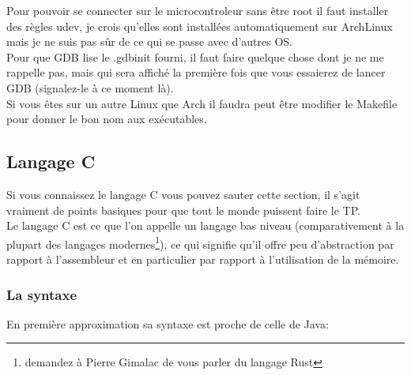 \documentclass[a4paper,10pt]{article} %
\begin{document}
Pour pouvoir se connecter sur le microcontroleur sans être root il faut installer des règles udev, je crois qu'elles sont installées automatiquement sur ArchLinux mais je ne suis pas sûr de ce qui se passe avec d'autres OS.\\

Pour que GDB lise le .gdbinit fourni, il faut faire quelque chose dont je ne me rappelle pas, mais qui sera affiché la première fois que vous essaierez de lancer GDB (signalez-le à ce moment là).\\

Si vous êtes sur un autre Linux que Arch il faudra peut être modifier le Makefile pour donner le bon nom aux exécutables.

\subsection{\label{rappels_c}Langage C}
Si vous connaissez le langage C vous pouvez sauter cette section, il s'agit vraiment de points basiques pour que tout le monde puissent faire le TP.\\

Le langage C est ce que l'on appelle un langage bas niveau (comparativement à la plupart des langages modernes\footnote{demandez à Pierre Gimalac de vous parler du langage Rust}), ce qui signifie qu'il offre peu d'abstraction par rapport à l'assembleur et en particulier par rapport à l'utilisation de la mémoire.\\

\subsubsection{La syntaxe}
En première approximation sa syntaxe est proche de celle de Java:
\end{document}
